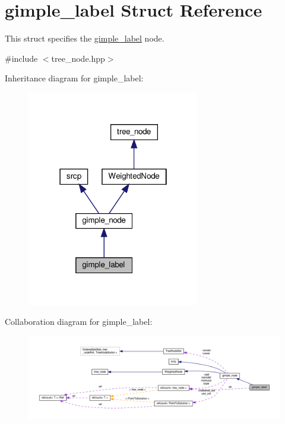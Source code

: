 \hypertarget{structgimple__label}{}\section{gimple\+\_\+label Struct Reference}
\label{structgimple__label}


This struct specifies the \hyperlink{structgimple__label}{gimple\+\_\+label} node.  




{\ttfamily \#include $<$tree\+\_\+node.\+hpp$>$}



Inheritance diagram for gimple\+\_\+label\+:
\nopagebreak
\begin{figure}[H]
\begin{center}
\leavevmode
\includegraphics[width=214pt]{d3/ddb/structgimple__label__inherit__graph}
\end{center}
\end{figure}


Collaboration diagram for gimple\+\_\+label\+:
\nopagebreak
\begin{figure}[H]
\begin{center}
\leavevmode
\includegraphics[width=350pt]{d5/d95/structgimple__label__coll__graph}
\end{center}
\end{figure}
